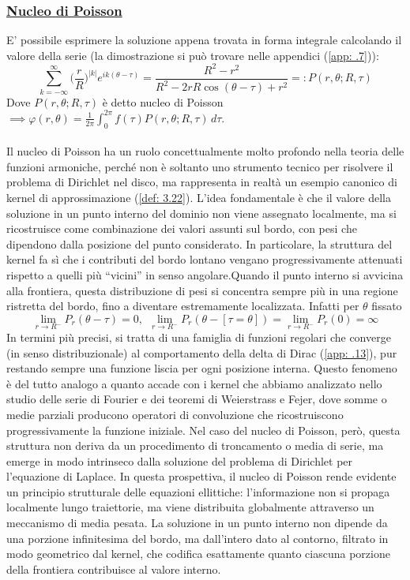 \documentclass[a4paper,12pt]{report}
\begin{document}
\subsubsection{\underline{Nucleo di Poisson}}

E' possibile esprimere la soluzione appena trovata in forma integrale calcolando il valore della serie (la dimostrazione si può trovare nelle appendici (\ref{app: .7})):
\[\sum_{k=-\infty}^\infty\bigg(\frac{r}{R}\bigg)^{|k|}e^{ik(\theta-\tau)}=\frac{R^2-r^2}{R^2-2rR\cos(\theta-\tau)+r^2}=:P(r,\theta; R,\tau)\]
Dove $P(r,\theta; R,\tau)$ è detto nucleo di Poisson $\implies \varphi(r,\theta)=\displaystyle\frac{1}{2\pi}\int_0^{2\pi}f(\tau)P(r,\theta;R, \tau)\,d\tau$.
\\
\\Il nucleo di Poisson ha un ruolo concettualmente molto profondo nella teoria delle funzioni armoniche, perché non è soltanto uno strumento tecnico per risolvere il problema di Dirichlet nel disco, ma rappresenta in realtà un esempio canonico di kernel di approssimazione (\ref{def: 3.22}). L’idea fondamentale è che il valore della soluzione in un punto interno del dominio non viene assegnato localmente, ma si ricostruisce come combinazione dei valori assunti sul bordo, con pesi che dipendono dalla posizione del punto considerato. In particolare, la struttura del kernel fa sì che i contributi del bordo lontano vengano progressivamente attenuati rispetto a quelli più “vicini” in senso angolare.Quando il punto interno si avvicina alla frontiera, questa distribuzione di pesi si concentra sempre più in una regione ristretta del bordo, fino a diventare estremamente localizzata. Infatti per $\theta$ fissato
\[
\lim_{r\to R^-}P_r(\theta-\tau)=0,\ \ \lim_{r\to R^-}P_r(\theta-[\tau=\theta])=\lim_{r\to R^-}P_r(0)=\infty
\]
In termini più precisi, si tratta di una famiglia di funzioni regolari che converge (in senso distribuzionale) al comportamento della delta di Dirac (\ref{app: .13}), pur restando sempre una funzione liscia per ogni posizione interna. Questo fenomeno è del tutto analogo a quanto accade con i kernel che abbiamo analizzato nello studio delle serie di Fourier e dei teoremi di Weierstrass e Fejer, dove somme o medie parziali producono operatori di convoluzione che ricostruiscono progressivamente la funzione iniziale. Nel caso del nucleo di Poisson, però, questa struttura non deriva da un procedimento di troncamento o media di serie, ma emerge in modo intrinseco dalla soluzione del problema di Dirichlet per l’equazione di Laplace. In questa prospettiva, il nucleo di Poisson rende evidente un principio strutturale delle equazioni ellittiche: l’informazione non si propaga localmente lungo traiettorie, ma viene distribuita globalmente attraverso un meccanismo di media pesata. La soluzione in un punto interno non dipende da una porzione infinitesima del bordo, ma dall’intero dato al contorno, filtrato in modo geometrico dal kernel, che codifica esattamente quanto ciascuna porzione della frontiera contribuisce al valore interno.
\end{document}
